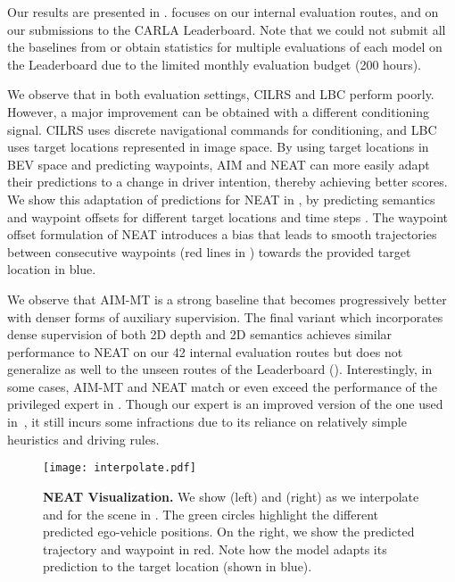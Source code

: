 Our results are presented in .  focuses on our internal evaluation routes, and  on our submissions to the CARLA Leaderboard. Note that we could not submit all the baselines from  or obtain statistics for multiple evaluations of each model on the Leaderboard due to the limited monthly evaluation budget (200 hours). 

We observe that in both evaluation settings, CILRS and LBC perform poorly. However, a major improvement can be obtained with a different conditioning signal. CILRS uses discrete navigational commands for conditioning, and LBC uses target locations represented in image space. By using target locations in BEV space and predicting waypoints, AIM and NEAT can more easily adapt their predictions to a change in driver intention, thereby achieving better scores. We show this adaptation of predictions for NEAT in , by predicting semantics and waypoint offsets for different target locations  and time steps . The waypoint offset formulation of NEAT introduces a bias that leads to smooth trajectories between consecutive waypoints ({\color{red}red lines} in ) towards the provided target location in {\color{blue}blue}.

 We observe that AIM-MT is a strong baseline that becomes progressively better with denser forms of auxiliary supervision. The final variant which incorporates dense supervision of both 2D depth and 2D semantics achieves similar performance to NEAT on our 42 internal evaluation routes but does not generalize as well to the unseen routes of the Leaderboard (). Interestingly, in some cases, AIM-MT and NEAT match or even exceed the performance of the privileged expert in . Though our expert is an improved version of the one used in~\cite{Chen2019CORL}, it still incurs some infractions due to its reliance on relatively simple heuristics and driving rules.

\begin{figure}[t!]
\centering
\texttt{[image: interpolate.pdf]}
\vspace{-0.7cm}
\caption{\textbf{NEAT Visualization.} We show  (left) and  (right) as we interpolate  and  for the scene in . The {\color{green}green circles} highlight the different predicted ego-vehicle positions. On the right, we show the predicted trajectory and waypoint  in {\color{red}red}. Note how the model adapts its prediction to the target location  (shown in {\color{blue}blue}).}
\label{fig:interp}
\vspace{-0.3cm}
\end{figure}

